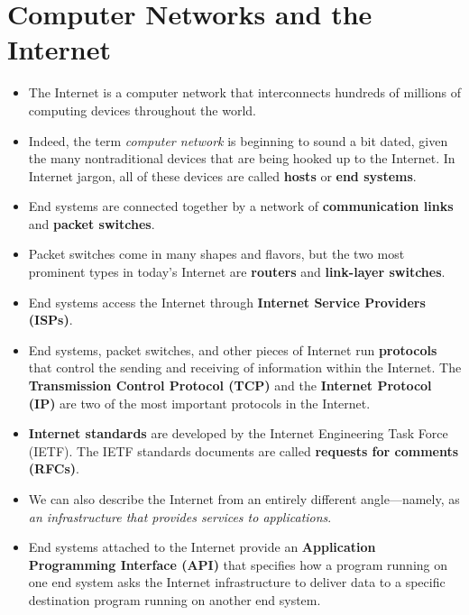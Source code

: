 \section{Computer Networks and the Internet}
\begin{itemize}

\item The Internet is a computer network that interconnects hundreds of millions of computing devices throughout the world.

\item Indeed, the term \textit{computer network} is beginning to sound a bit dated, given the many nontraditional devices that are being hooked up to the Internet. In Internet jargon, all of these devices are called \textbf{hosts} or \textbf{end systems}.

\item End systems are connected together by a network of \textbf{communication links} and \textbf{packet switches}.

\item Packet switches come in many shapes and flavors, but the two most prominent types in today's Internet are \textbf{routers} and \textbf{link-layer switches}.

\item End systems access the Internet through \textbf{Internet Service Providers (ISPs)}.

\item End systems, packet switches, and other pieces of Internet run \textbf{protocols} that control the sending and receiving of information within the Internet. The \textbf{Transmission Control Protocol (TCP)} and the \textbf{Internet Protocol (IP)} are two of the most important protocols in the Internet.

\item \textbf{Internet standards} are developed by the Internet Engineering Task Force (IETF). The IETF standards documents are called \textbf{requests for comments (RFCs)}.

\item We can also describe the Internet from an entirely different angle---namely, as \textit{an infrastructure that provides services to applications}.

\item End systems attached to the Internet provide an \textbf{Application Programming Interface (API)} that specifies how a program running on one end system asks the Internet infrastructure to deliver data to a specific destination program running on another end system.


\end{itemize}
